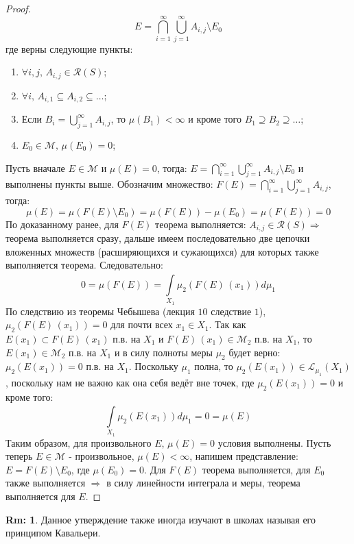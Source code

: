 \documentclass[12pt]{article}
\newcommand{\MCR}{\mathcal{R}}
\newcommand{\ML}{\mathcal{L}}
\newcommand{\MM}{\mathcal{M}}
\theoremstyle{definition}
\newtheorem{rem}{Rm:}
\newcommand{\ddint}[2]{\displaystyle\int\limits_{#1}^{#2}}
\begin{document}
\begin{proof}
	$$
		E = \bigcap\limits_{i = 1}^{\infty}\bigcup\limits_{j = 1}^{\infty}A_{i,j} \setminus E_0
	$$
	где верны следующие пункты:
	\begin{enumerate}[label=\arabic*)]
		\item $\forall i,j, \, A_{i,j} \in \MCR(S)$;
		\item $\forall i, \, A_{i,1} \subseteq A_{i,2} \subseteq \dotsc$;
		\item Если $B_i = \bigcup_{j = 1}^{\infty}A_{i,j}$, то $\mu(B_1) < \infty$ и кроме того $B_1 \supseteq B_2 \supseteq \dotsc$;
		\item $E_0 \in \MM, \, \mu(E_0) = 0$;
	\end{enumerate}
	Пусть вначале $E \in \MM$ и $\mu(E) = 0$, тогда: $E = \bigcap_{i = 1}^{\infty}\bigcup_{j = 1}^{\infty}A_{i,j} \setminus E_0$ и выполнены пункты выше. Обозначим множество: $F(E) = \bigcap_{i = 1}^{\infty}\bigcup_{j = 1}^{\infty}A_{i,j}$, тогда:
	$$
		\mu(E) = \mu(F(E) \setminus E_0) = \mu(F(E)) - \mu(E_0) = \mu(F(E)) = 0
	$$
	По доказанному ранее, для $F(E)$ теорема выполняется: $A_{i,j} \in \MCR(S) \Rightarrow$ теорема выполняется сразу, дальше имеем последовательно две цепочки вложенных множеств (расширяющихся и сужающихся) для которых также выполняется теорема. Следовательно:
	$$
		0 = \mu(F(E)) = \ddint{X_1}{}\mu_2(F(E)\,(x_1))d\mu_1
	$$
	По следствию из теоремы Чебышева (лекция $10$ следствие $1$), $\mu_2(F(E)\,(x_1)) = 0$ для почти всех $x_1 \in X_1$. Так как $E(x_1) \subset F(E) \, (x_1)$ п.в. на $X_1$ и $F(E)\, (x_1)\in \MM_2$ п.в. на $X_1$, то $E(x_1) \in \MM_2$ п.в. на $X_1$ и в силу полноты меры $\mu_2$ будет верно: $\mu_2(E(x_1)) = 0$ п.в. на $X_1$. Поскольку $\mu_1$ полна, то $\mu_2(E(x_1)) \in \ML_{\mu_1}(X_1)$, поскольку нам не важно как она себя ведёт вне точек, где $\mu_2(E(x_1)) = 0$ и кроме того:
	$$
		\ddint{X_1}{}\mu_2(E(x_1))d\mu_1 = 0 = \mu(E)
	$$
	Таким образом, для произвольного $E$, $\mu(E) = 0$ условия выполнены. Пусть теперь $E \in \MM$ - произвольное, $\mu(E) < \infty$, напишем представление: $E = F(E) \setminus E_0$, где $\mu(E_0) = 0$. Для $F(E)$ теорема выполняется, для $E_0$ также выполняется $\Rightarrow$ в силу линейности интеграла и меры, теорема выполняется для $E$.
\end{proof}

\begin{rem}
	Данное утверждение также иногда изучают в школах называя его принципом Кавальери.
\end{rem}
\end{document}
